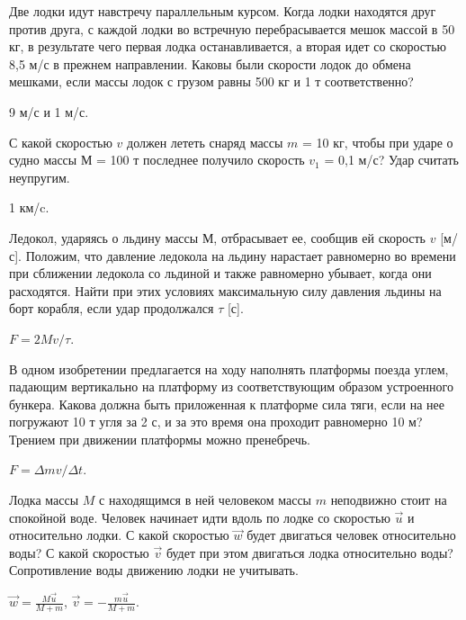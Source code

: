 \begin{ex} %
Две лодки идут навстречу параллельным курсом. Когда лодки находятся друг против друга, с каждой лодки во встречную перебрасывается мешок массой в 50 кг, в результате чего первая лодка останавливается, а вторая идет со скоростью 8,5 м/с в прежнем направлении. Каковы были скорости лодок до обмена мешками, если массы лодок с грузом равны 500 кг и 1 т соответственно?
\begin{ans}
9 м/с и 1 м/с.
\end{ans}
\end{ex}

\begin{ex} %
С какой скоростью $v$ должен лететь снаряд массы $m$ = 10 кг, чтобы при ударе о судно массы $М$ = 100 т последнее получило скорость $v_1$ = 0,1 м/с? Удар считать неупругим.
\begin{ans}
1 км/c.
\end{ans}
\end{ex}

\begin{ex} %
Ледокол, ударяясь о льдину массы $М$, отбрасывает ее, сообщив ей скорость $v$ [м/с]. Положим, что давление ледокола на льдину нарастает равномерно во времени при сближении ледокола со льдиной и также равномерно убывает, когда они расходятся. Найти при этих условиях максимальную силу давления льдины на борт корабля, если удар продолжался $\tau$ [с].
\begin{ans}
$F = 2Mv/\tau$.
\end{ans}
\end{ex}

\begin{ex} %
В одном изобретении предлагается на ходу наполнять платформы поезда углем, падающим вертикально на платформу из соответствующим образом устроенного бункера. Какова должна быть приложенная к платформе сила тяги, если на нее погружают 10 т угля за 2 с, и за это время она проходит равномерно 10 м? Трением при движении платформы можно пренебречь.
\begin{ans}
$F = \Delta m v/ \Delta t$.
\end{ans}
\end{ex}

\begin{ex} %
Лодка массы $M$ с находящимся в ней человеком массы $m$ неподвижно стоит на спокойной воде. Человек начинает идти вдоль по лодке со скоростью $\vec{u}$ и относительно лодки. С какой скоростью $\vec{w}$ будет двигаться человек относительно воды? С какой скоростью $\vec{v}$ будет при этом двигаться лодка относительно воды? Сопротивление воды движению лодки не учитывать.
\begin{ans}
$\vec{w} = \frac{M\vec{u}}{M+m}$, $\vec{v} = -\frac{m\vec{u}}{M+m}$.
\end{ans}
\end{ex}

